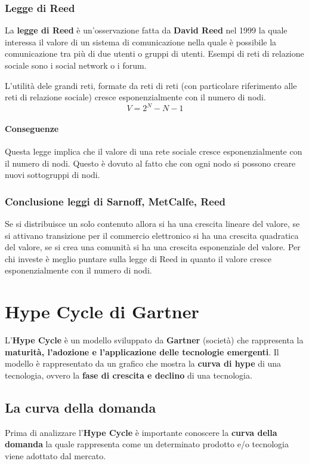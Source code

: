         \subsubsection{Legge di Reed}
            La \textbf{legge di Reed} è un'osservazione fatta da \textbf{David Reed} nel 1999 la quale interessa il valore di un sistema di comunicazione nella quale è possibile la comunicazione tra più di due utenti o gruppi di utenti. Esempi di reti di relazione sociale sono i social network o i forum.
            \begin{definition}
                L'utilità dele grandi reti, formate da reti di reti (con particolare riferimento alle reti di relazione sociale) cresce esponenzialmente con il numero di nodi. $$ V = 2^N - N - 1 $$
            \end{definition}
            \paragraph{Conseguenze} Questa legge implica che il valore di una rete sociale cresce esponenzialmente con il numero di nodi. Questo è dovuto al fatto che con ogni nodo si possono creare nuovi sottogruppi di nodi.
        \subsubsection{Conclusione leggi di Sarnoff, MetCalfe, Reed}
            Se si distribuisce un solo contenuto allora si ha una crescita lineare del valore, se si attivano transizione per il commercio elettronico si ha una crescita quadratica del valore, se si crea una comunità si ha una crescita esponenziale del valore. \newline Per chi investe è meglio puntare sulla legge di Reed in quanto il valore cresce esponenzialmente con il numero di nodi.
\section{Hype Cycle di Gartner}
    L'\textbf{Hype Cycle} è un modello sviluppato da \textbf{Gartner} (società) che rappresenta la \textbf{maturità, l'adozione e l'applicazione delle tecnologie emergenti}. Il modello è rappresentato da un grafico che mostra la \textbf{curva di hype} di una tecnologia, ovvero la \textbf{fase di crescita e declino} di una tecnologia.
    \subsection{La curva della domanda}
        Prima di analizzare l'\textbf{Hype Cycle} è importante conoscere la \textbf{curva della domanda} la quale rappresenta come un determinato prodotto e/o tecnologia viene adottato dal mercato.
